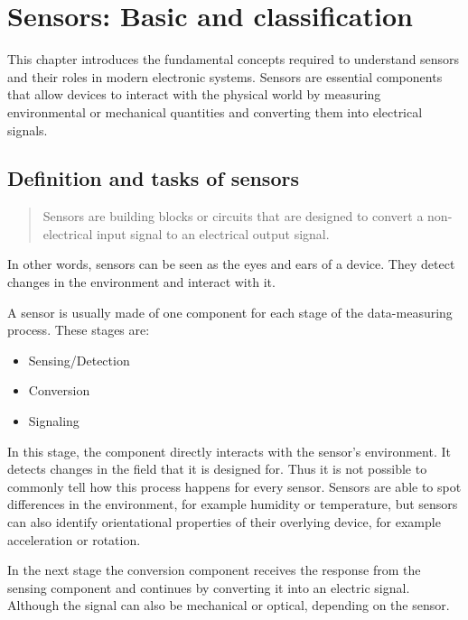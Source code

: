 \chapter{Sensors: Basic and classification}\label{chap:luca-introduction}
This chapter introduces the fundamental concepts required to understand sensors and their roles in modern electronic systems. Sensors are essential components that allow devices to interact with the physical world by measuring environmental or mechanical quantities and converting them into electrical signals.

\section{Definition and tasks of sensors}
\begin{quote}
    Sensors are building blocks or circuits that are designed to convert a non-electrical input signal to an electrical output signal.
\end{quote}
\noindent\cite{LRWeb:26}

In other words, sensors can be seen as the eyes and ears of a device. They detect changes in the environment and interact with it. 

A sensor is usually made of one component for each stage of the data-measuring process. These stages are:

\begin{itemize}
    \item Sensing/Detection
    \item Conversion
    \item Signaling
\end{itemize}

In this stage, the component directly interacts with the sensor's environment. It detects changes in the field that it is designed for. Thus it is not possible to commonly tell how this process happens for every sensor. Sensors are able to spot differences in the environment, for example humidity or temperature, but sensors can also identify orientational properties of their overlying device, for example acceleration or rotation.

In the next stage the conversion component receives the response from the sensing component and continues by converting it into an electric signal. Although the signal can also be mechanical or optical, depending on the sensor. 

